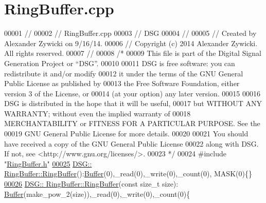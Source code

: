 \hypertarget{_ring_buffer_8cpp_source}{\section{Ring\+Buffer.\+cpp}
\label{_ring_buffer_8cpp_source}
}

\begin{DoxyCode}
00001 \textcolor{comment}{//}
00002 \textcolor{comment}{//  RingBuffer.cpp}
00003 \textcolor{comment}{//  DSG}
00004 \textcolor{comment}{//}
00005 \textcolor{comment}{//  Created by Alexander Zywicki on 9/16/14.}
00006 \textcolor{comment}{//  Copyright (c) 2014 Alexander Zywicki. All rights reserved.}
00007 \textcolor{comment}{//}
00008 \textcolor{comment}{/*}
00009 \textcolor{comment}{ This file is part of the Digital Signal Generation Project or “DSG”.}
00010 \textcolor{comment}{}
00011 \textcolor{comment}{ DSG is free software: you can redistribute it and/or modify}
00012 \textcolor{comment}{ it under the terms of the GNU General Public License as published by}
00013 \textcolor{comment}{ the Free Software Foundation, either version 3 of the License, or}
00014 \textcolor{comment}{ (at your option) any later version.}
00015 \textcolor{comment}{}
00016 \textcolor{comment}{ DSG is distributed in the hope that it will be useful,}
00017 \textcolor{comment}{ but WITHOUT ANY WARRANTY; without even the implied warranty of}
00018 \textcolor{comment}{ MERCHANTABILITY or FITNESS FOR A PARTICULAR PURPOSE.  See the}
00019 \textcolor{comment}{ GNU General Public License for more details.}
00020 \textcolor{comment}{}
00021 \textcolor{comment}{ You should have received a copy of the GNU General Public License}
00022 \textcolor{comment}{ along with DSG.  If not, see <http://www.gnu.org/licenses/>.}
00023 \textcolor{comment}{ */}
00024 \textcolor{preprocessor}{#include "\hyperlink{_ring_buffer_8h}{RingBuffer.h}"}
\hypertarget{_ring_buffer_8cpp_source_l00025}{}\hyperlink{class_d_s_g_1_1_ring_buffer_a3136c9debb3c422adb1d5835e11b2b99}{00025} \hyperlink{class_d_s_g_1_1_ring_buffer_a3136c9debb3c422adb1d5835e11b2b99}{DSG:: RingBuffer::RingBuffer}():\hyperlink{class_d_s_g_1_1_buffer}{Buffer}(0),\_read(0),\_write(0),\_count(0),
      MASK(0)\{\}
\hypertarget{_ring_buffer_8cpp_source_l00026}{}\hyperlink{class_d_s_g_1_1_ring_buffer_ae9859fd3ad18961de494d8b50fe4763e}{00026} \hyperlink{class_d_s_g_1_1_ring_buffer_a3136c9debb3c422adb1d5835e11b2b99}{DSG:: RingBuffer::RingBuffer}(\textcolor{keyword}{const} \textcolor{keywordtype}{size\_t} size):
      \hyperlink{class_d_s_g_1_1_buffer}{Buffer}(make\_pow\_2(size)),\_read(0),\_write(0),\_count(0)\{

\end{DoxyCode}
